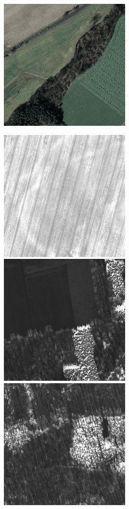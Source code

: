 \begin{figure}
    \includegraphics[width=\VegetationIndicesImageWidth]{images/vegetation/original/5}

    \vspace{3mm}
    \includegraphics[width=\VegetationIndicesImageWidth]{images/vegetation/rvi/1} \hfill
    \includegraphics[width=\VegetationIndicesImageWidth]{images/vegetation/rvi/2} \hfill
    \includegraphics[width=\VegetationIndicesImageWidth]{images/vegetation/rvi/3} \hfill

\end{figure}
